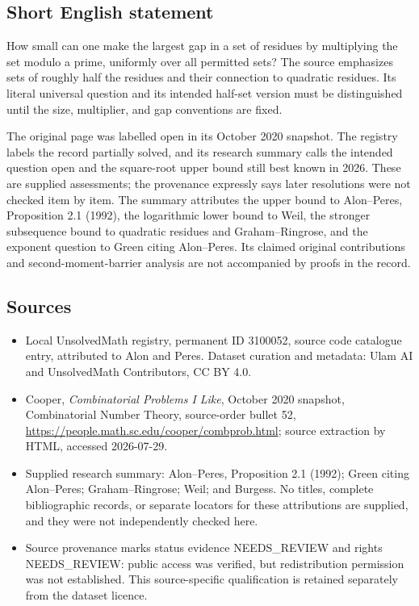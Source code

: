 \documentclass[11pt]{article}
\begin{document}
\subsection{Short English statement}
How small can one make the largest gap in a set of residues by multiplying the set modulo a prime, uniformly over all permitted sets? The source emphasizes sets of roughly half the residues and their connection to quadratic residues. Its literal universal question and its intended half-set version must be distinguished until the size, multiplier, and gap conventions are fixed.

The original page was labelled open in its October 2020 snapshot. The registry labels the record partially solved, and its research summary calls the intended question open and the square-root upper bound still best known in 2026. These are supplied assessments; the provenance expressly says later resolutions were not checked item by item. The summary attributes the upper bound to Alon--Peres, Proposition 2.1 (1992), the logarithmic lower bound to Weil, the stronger subsequence bound to quadratic residues and Graham--Ringrose, and the exponent question to Green citing Alon--Peres. Its claimed original contributions and second-moment-barrier analysis are not accompanied by proofs in the record.
\subsection{Sources}
\begin{itemize}
\item Local UnsolvedMath registry, permanent ID 3100052, source code catalogue entry, attributed to Alon and Peres. Dataset curation and metadata: Ulam AI and UnsolvedMath Contributors, CC BY 4.0.
\item Cooper, \emph{Combinatorial Problems I Like}, October 2020 snapshot, Combinatorial Number Theory, source-order bullet 52, \url{https://people.math.sc.edu/cooper/combprob.html}; source extraction by HTML, accessed 2026-07-29.
\item Supplied research summary: Alon--Peres, Proposition 2.1 (1992); Green citing Alon--Peres; Graham--Ringrose; Weil; and Burgess. No titles, complete bibliographic records, or separate locators for these attributions are supplied, and they were not independently checked here.
\item Source provenance marks status evidence NEEDS\_REVIEW and rights NEEDS\_REVIEW: public access was verified, but redistribution permission was not established. This source-specific qualification is retained separately from the dataset licence.
\end{itemize}
\end{document}
